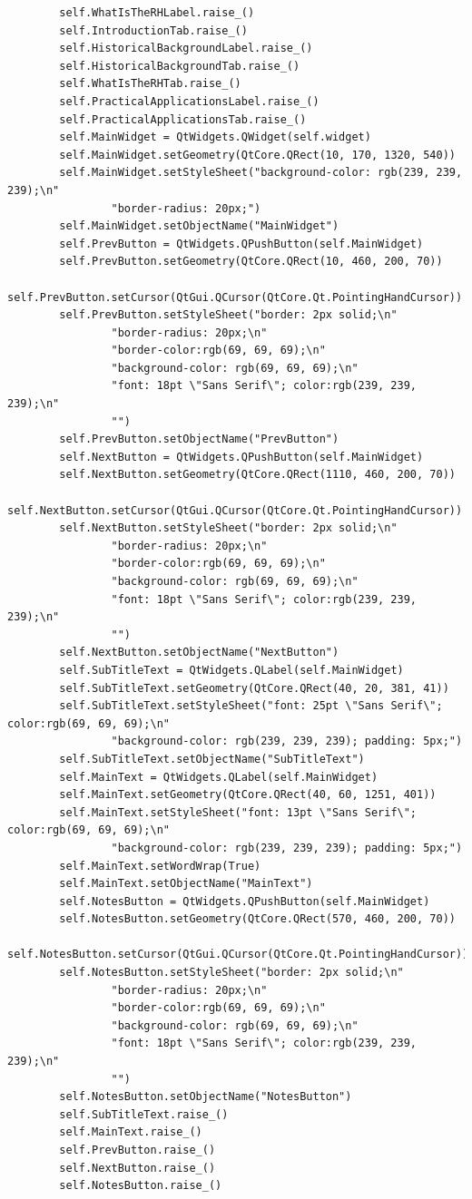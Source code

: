 \documentclass{article}
\begin{document}
\begin{lstlisting}
        self.WhatIsTheRHLabel.raise_()
        self.IntroductionTab.raise_()
        self.HistoricalBackgroundLabel.raise_()
        self.HistoricalBackgroundTab.raise_()
        self.WhatIsTheRHTab.raise_()
        self.PracticalApplicationsLabel.raise_()
        self.PracticalApplicationsTab.raise_()
        self.MainWidget = QtWidgets.QWidget(self.widget)
        self.MainWidget.setGeometry(QtCore.QRect(10, 170, 1320, 540))
        self.MainWidget.setStyleSheet("background-color: rgb(239, 239, 239);\n"
                "border-radius: 20px;")
        self.MainWidget.setObjectName("MainWidget")
        self.PrevButton = QtWidgets.QPushButton(self.MainWidget)
        self.PrevButton.setGeometry(QtCore.QRect(10, 460, 200, 70))
        self.PrevButton.setCursor(QtGui.QCursor(QtCore.Qt.PointingHandCursor))
        self.PrevButton.setStyleSheet("border: 2px solid;\n"
                "border-radius: 20px;\n"
                "border-color:rgb(69, 69, 69);\n"
                "background-color: rgb(69, 69, 69);\n"
                "font: 18pt \"Sans Serif\"; color:rgb(239, 239, 239);\n"
                "")
        self.PrevButton.setObjectName("PrevButton")
        self.NextButton = QtWidgets.QPushButton(self.MainWidget)
        self.NextButton.setGeometry(QtCore.QRect(1110, 460, 200, 70))
        self.NextButton.setCursor(QtGui.QCursor(QtCore.Qt.PointingHandCursor))
        self.NextButton.setStyleSheet("border: 2px solid;\n"
                "border-radius: 20px;\n"
                "border-color:rgb(69, 69, 69);\n"
                "background-color: rgb(69, 69, 69);\n"
                "font: 18pt \"Sans Serif\"; color:rgb(239, 239, 239);\n"
                "")
        self.NextButton.setObjectName("NextButton")
        self.SubTitleText = QtWidgets.QLabel(self.MainWidget)
        self.SubTitleText.setGeometry(QtCore.QRect(40, 20, 381, 41))
        self.SubTitleText.setStyleSheet("font: 25pt \"Sans Serif\"; color:rgb(69, 69, 69);\n"
                "background-color: rgb(239, 239, 239); padding: 5px;")
        self.SubTitleText.setObjectName("SubTitleText")
        self.MainText = QtWidgets.QLabel(self.MainWidget)
        self.MainText.setGeometry(QtCore.QRect(40, 60, 1251, 401))
        self.MainText.setStyleSheet("font: 13pt \"Sans Serif\"; color:rgb(69, 69, 69);\n"
                "background-color: rgb(239, 239, 239); padding: 5px;")
        self.MainText.setWordWrap(True)
        self.MainText.setObjectName("MainText")
        self.NotesButton = QtWidgets.QPushButton(self.MainWidget)
        self.NotesButton.setGeometry(QtCore.QRect(570, 460, 200, 70))
        self.NotesButton.setCursor(QtGui.QCursor(QtCore.Qt.PointingHandCursor))
        self.NotesButton.setStyleSheet("border: 2px solid;\n"
                "border-radius: 20px;\n"
                "border-color:rgb(69, 69, 69);\n"
                "background-color: rgb(69, 69, 69);\n"
                "font: 18pt \"Sans Serif\"; color:rgb(239, 239, 239);\n"
                "")
        self.NotesButton.setObjectName("NotesButton")
        self.SubTitleText.raise_()
        self.MainText.raise_()
        self.PrevButton.raise_()
        self.NextButton.raise_()
        self.NotesButton.raise_()


\end{lstlisting}
\end{document}

